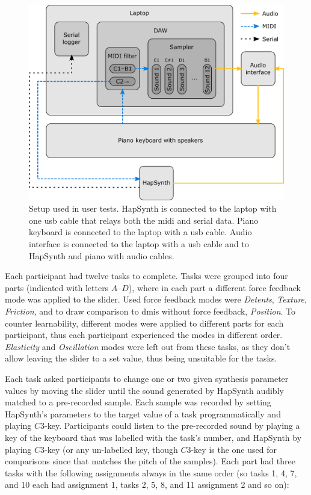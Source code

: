 \begin{figure}[h]
	\centering
	\includegraphics[width=1.0\linewidth]{figures/setup.png}
	\caption{Setup used in user tests. HapSynth is connected to the laptop with one \gls{usb} cable that relays both the \gls{midi} and serial data. Piano keyboard is connected to the laptop with a \gls{usb} cable. Audio interface is connected to the laptop with a \gls{usb} cable and to HapSynth and piano with audio cables.}
	\label{setup}
\end{figure}

Each participant had twelve tasks to complete. Tasks were grouped into four parts (indicated with letters $A$--$D$), where in each part a different force feedback mode was applied to the slider. Used force feedback modes were \textit{Detents}, \textit{Texture}, \textit{Friction}, and to draw comparison to \glspl{dmi} without force feedback, \textit{Position}. To counter learnability, different modes were applied to different parts for each participant, thus each participant experienced the modes in different order. \textit{Elasticity} and \textit{Oscillation} modes were left out from these tasks, as they don't allow leaving the slider to a set value, thus being unsuitable for the tasks.

Each task asked participants to change one or two given synthesis parameter values by moving the slider until the sound generated by HapSynth audibly matched to a pre-recorded sample. Each sample was recorded by setting HapSynth's parameters to the target value of a task programmatically and playing $C3$-key. Participants could listen to the pre-recorded sound by playing a key of the keyboard that was labelled with the task's number, and HapSynth by playing $C3$-key (or any un-labelled key, though $C3$-key is the one used for comparisons since that matches the pitch of the samples). Each part had three tasks with the following assignments always in the same order (so tasks 1, 4, 7, and 10 each had assignment 1, tasks 2, 5, 8, and 11 assignment 2 and so on):

